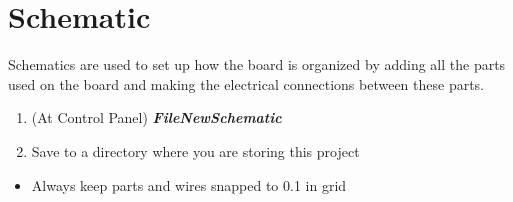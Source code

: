 \documentclass{article}
\begin{document}
\section{Schematic}
Schematics are used to set up how the board is organized by adding all the parts used on the board and making the electrical connections between these parts.
\begin{enumerate}
    \item (At Control Panel) \textit{\textbf{File\textrightarrow New\textrightarrow Schematic}}
    \item Save to a directory where you are storing this project
\end{enumerate}
\begin{tcolorbox} [title=Tips \& Tricks]
    \begin{itemize}
        \item Always keep parts and wires snapped to 0.1 in grid
    \end{itemize}
\end{tcolorbox}
\end{document}
